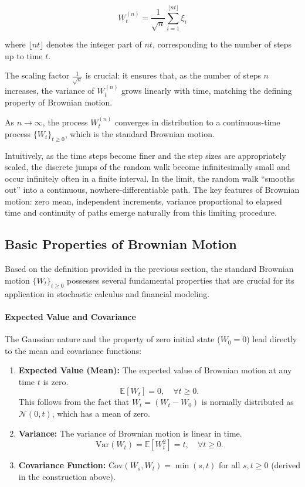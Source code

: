 \begin{enumerate}
    $$
    W^{(n)}_t = \frac{1}{\sqrt{n}} \sum_{i=1}^{\lfloor nt \rfloor} \xi_i
    $$
    
where $\lfloor nt \rfloor$ denotes the integer part of $nt$, corresponding to the number of steps up to time $t$.

The scaling factor $\frac{1}{\sqrt{n}}$ is crucial: it ensures that, as the number of steps $n$ increases, the variance of $W^{(n)}_t$ grows linearly with time, matching the defining property of Brownian motion. 

As $n \to \infty$, the process $W^{(n)}_t$ converges in distribution to a continuous-time process $\{W_t\}_{t \ge 0}$, which is the standard Brownian motion. 

Intuitively, as the time steps become finer and the step sizes are appropriately scaled, the discrete jumps of the random walk become infinitesimally small and occur infinitely often in a finite interval. In the limit, the random walk “smooths out” into a continuous, nowhere-differentiable path. The key features of Brownian motion: zero mean, independent increments, variance proportional to elapsed time and continuity of paths emerge naturally from this limiting procedure. 
\end{enumerate}

\subsection{Basic Properties of Brownian Motion}

Based on the definition provided in the previous section, the standard Brownian motion $\{W_t\}_{t \ge 0}$ possesses several fundamental properties that are crucial for its application in stochastic calculus and financial modeling.
\paragraph{Expected Value and Covariance}
The Gaussian nature and the property of zero initial state ($W_0=0$) lead directly to the mean and covariance functions:

\begin{enumerate}
    \item \textbf{Expected Value (Mean):} The expected value of Brownian motion at any time $t$ is zero.
    \[
    \mathbb{E}[W_t] = 0, \quad \forall t \ge 0.
    \]
    This follows from the fact that $W_t = (W_t - W_0)$ is normally distributed as $\mathcal{N}(0, t)$, which has a mean of zero.

    \item \textbf{Variance:} The variance of Brownian motion is linear in time.
    \[
    \text{Var}(W_t) = \mathbb{E}[W_t^2] = t, \quad \forall t \ge 0.
    \]

    \item \textbf{Covariance Function:} $\text{Cov}(W_s, W_t) = \min(s,t)$ for all $s,t \ge 0$ (derived in the construction above).
\end{enumerate}

